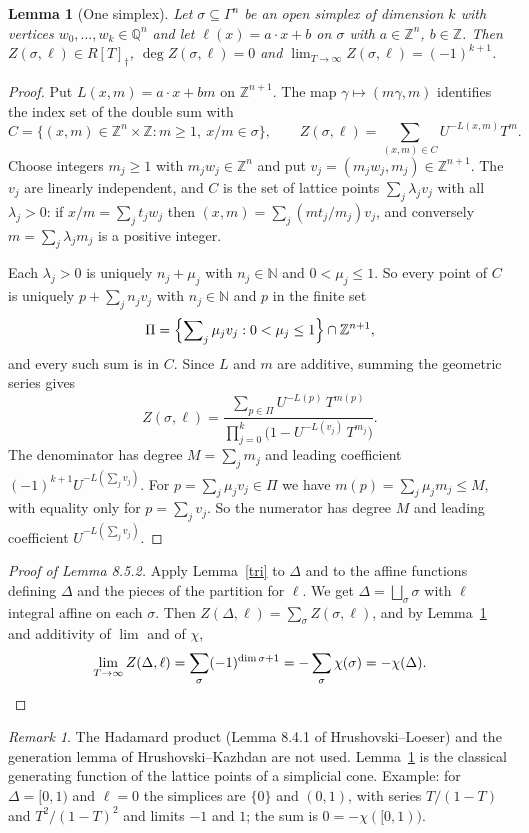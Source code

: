 \documentclass[12pt]{amsart}
\newtheorem{lem}{Lemma}
\theoremstyle{remark}
\newtheorem*{rem}{Remark}
\newcommand{\Z}{\mathbb Z}
\newcommand{\Q}{\mathbb Q}
\newcommand{\N}{\mathbb N}
\begin{document}
\begin{lem}[One simplex]\label{cone}
Let $\sigma \subseteq \Gamma^n$ be an open simplex of dimension $k$ with vertices $w_0, \ldots, w_k \in \Q^n$ and let $\ell(x) = a \cdot x + b$ on $\sigma$ with $a \in \Z^n$, $b \in \Z$. Then $Z(\sigma, \ell) \in R[T]_\dag$, $\deg Z(\sigma, \ell) = 0$ and $\lim_{T \to \infty} Z(\sigma, \ell) = (-1)^{k+1}$.
\end{lem}
\begin{proof}
Put $L(x, m) = a \cdot x + b m$ on $\Z^{n+1}$. The map $\gamma \mapsto (m\gamma, m)$ identifies the index set of the double sum with
\[
C = \{(x, m) \in \Z^n \times \Z : m \geq 1, \ x/m \in \sigma\}, \qquad Z(\sigma, \ell) = \sum_{(x,m) \in C} U^{-L(x,m)} T^m .
\]
Choose integers $m_j \geq 1$ with $m_j w_j \in \Z^n$ and put $v_j = (m_j w_j, m_j) \in \Z^{n+1}$. The $v_j$ are linearly independent, and $C$ is the set of lattice points $\sum_j \lambda_j v_j$ with all $\lambda_j > 0$: if $x/m = \sum_j t_j w_j$ then $(x, m) = \sum_j (m t_j / m_j) v_j$, and conversely $m = \sum_j \lambda_j m_j$ is a positive integer.

Each $\lambda_j > 0$ is uniquely $n_j + \mu_j$ with $n_j \in \N$ and $0 < \mu_j \leq 1$. So every point of $C$ is uniquely $p + \sum_j n_j v_j$ with $n_j \in \N$ and $p$ in the finite set
\[
\Pi = \Bigl\{ \sum\nolimits_j \mu_j v_j : 0 < \mu_j \leq 1 \Bigr\} \cap \Z^{n+1},
\]
and every such sum is in $C$. Since $L$ and $m$ are additive, summing the geometric series gives
\[
Z(\sigma, \ell) = \frac{\sum_{p \in \Pi} U^{-L(p)}\, T^{m(p)}}{\prod_{j=0}^{k} \bigl(1 - U^{-L(v_j)}\, T^{m_j}\bigr)} .
\]
The denominator has degree $M = \sum_j m_j$ and leading coefficient $(-1)^{k+1} U^{-L(\sum_j v_j)}$. For $p = \sum_j \mu_j v_j \in \Pi$ we have $m(p) = \sum_j \mu_j m_j \leq M$, with equality only for $p = \sum_j v_j$. So the numerator has degree $M$ and leading coefficient $U^{-L(\sum_j v_j)}$.
\end{proof}

\begin{proof}[Proof of Lemma 8.5.2]
Apply Lemma~\ref{tri} to $\Delta$ and to the affine functions defining $\Delta$ and the pieces of the partition for $\ell$. We get $\Delta = \bigsqcup_\sigma \sigma$ with $\ell$ integral affine on each $\sigma$. Then $Z(\Delta, \ell) = \sum_\sigma Z(\sigma, \ell)$, and by Lemma~\ref{cone} and additivity of $\lim$ and of $\chi$,
\[
\lim_{T \to \infty} Z(\Delta, \ell) = \sum_\sigma (-1)^{\dim \sigma + 1} = - \sum_\sigma \chi(\sigma) = - \chi(\Delta). \qedhere
\]
\end{proof}

\begin{rem}
The Hadamard product (Lemma 8.4.1 of Hrushovski--Loeser) and the generation lemma of Hrushovski--Kazhdan are not used. Lemma~\ref{cone} is the classical generating function of the lattice points of a simplicial cone. Example: for $\Delta = [0,1)$ and $\ell = 0$ the simplices are $\{0\}$ and $(0,1)$, with series $T/(1-T)$ and $T^2/(1-T)^2$ and limits $-1$ and $1$; the sum is $0 = -\chi([0,1))$.
\end{rem}
\end{document}
